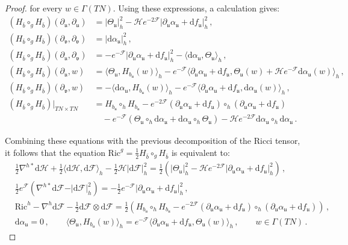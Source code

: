 \documentclass[10pt,a4paper,twoside,reqno]{amsart}
\theoremstyle{plain}
\theoremstyle{definition}
\theoremstyle{remark}
\def\dd{\mathrm{d}}
\def\cH{\mathcal{H}}
\def\cF{\mathcal{F}}
\def\cH{\mathcal{H}}
\def\dd{\mathrm{d}}
\def\fru{\mathfrak{u}}
\def\frv{\mathfrak{v}}
\begin{document}
\begin{proof}
\noindent
for every $w\in\Gamma(TN)$. Using these expressions, a calculation gives:
\begin{equation}\label{eq:HHstandard}
\begin{aligned}
(H_{\bar{b}}\circ_g H_{\bar{b}})(\partial_{\fru} , \partial_{\fru}) &= \vert\Theta_{\fru}\vert^2_h - \cH e^{-2\cF} \vert \partial_{\fru} \alpha_{\fru} + \dd f_{\fru}\vert_h^2\, ,\\
(H_{\bar{b}}\circ_g H_{\bar{b}})(\partial_{\frv} , \partial_{\frv}) &= \vert \dd \alpha_{\fru} \vert^2_h\, ,\\
(H_{\bar{b}}\circ_g H_{\bar{b}})(\partial_{\fru} , \partial_{\frv}) &= - e^{-\cF} \vert \partial_{\fru} \alpha_{\fru} + \dd f_{\fru}\vert^2_h - \langle \dd\alpha_{\fru}, \Theta_{\fru} \rangle_h\, ,\\
(H_{\bar{b}}\circ_g H_{\bar{b}})(\partial_{\fru} , w) &= \langle \Theta_{\fru} , H_{b_{\fru}}(w) \rangle_h - e^{-\cF}\langle \partial_{\fru}\alpha_{\fru} + \dd f_{\fru} , \Theta_{\fru}(w) + \cH e^{-\cF} \dd\alpha_{\fru}(w)\rangle_h\, ,\\
(H_{\bar{b}}\circ_g H_{\bar{b}})(\partial_{\frv} , w) &= - \langle \dd\alpha_{\fru} , H_{b_{\fru}}(w) \rangle_h - e^{-\cF}\langle \partial_{\fru}\alpha_{\fru} + \dd f_{\fru}, \dd\alpha_{\fru}(w)\rangle_h\, ,\\
(H_{\bar{b}}\circ_g H_{\bar{b}})\vert_{TN\times TN} &= H_{b_{\fru}}\circ_h H_{b_{\fru}} - e^{-2\cF} (\partial_{\fru}\alpha_{\fru} + \dd f_{\fru} ) \circ_h (\partial_{\fru}\alpha_{\fru} + \dd f_{\fru})\\
&\quad - e^{-\cF} (\Theta_{\fru}\circ_h \dd \alpha_{\fru} + \dd \alpha_{\fru} \circ_h \Theta_{\fru}) - \cH e^{-2\cF} \dd \alpha_{\fru} \circ_h \dd \alpha_{\fru}\, .
\end{aligned}
\end{equation}

\noindent
Combining these equations with the previous decomposition of the Ricci tensor, it follows that the equation $\mathrm{Ric}^g = \frac{1}{2} H_{\bar{b}} \circ_g H_{\bar{b}}$ is equivalent to:
 \begin{eqnarray*}
& \frac{1}{2} \nabla^{h\ast} \dd\cH + \frac{1}{2} \langle \dd\cH, \dd\cF \rangle_h - \frac{1}{2} \cH \vert \dd\cF \vert^2_h  =  \frac{1}{2} (\vert\Theta_{\fru} \vert^2_h - \cH e^{-2\cF} \vert \partial_{\fru} \alpha_{\fru} + \dd f_{\fru}\vert_h^2)\, ,\\  
& \frac{1}{2} e^{\cF} \left( \nabla^{h\ast}\dd \cF - \vert \dd\cF \vert^2_h \right)  = - \frac{1}{2} e^{-\cF} \vert \partial_{\fru} \alpha_{\fru} + \dd f_{\fru} \vert^2_h\, ,\\
& \mathrm{Ric}^h - \nabla^h \dd \cF - \frac{1}{2} \dd \cF \otimes \dd \cF =\frac{1}{2} (H_{b_{\fru}}\circ_h H_{b_{\fru}} - e^{-2\cF} (\partial_{\fru}\alpha_{\fru} + \dd f_{\fru})\circ_h (\partial_{\fru}\alpha_{\fru} + \dd f_{\fru}))\, ,\\
&  \dd\alpha_{\fru} = 0\, ,\qquad \langle \Theta_{\fru} , H_{b_{\fru}}(w) \rangle_h = e^{-\cF}\langle \partial_{\fru}\alpha_{\fru} + \dd f_{\fru} , \Theta_{\fru}(w)  \rangle_h\, , \qquad w\in\Gamma(TN)\, .
\end{eqnarray*}


\end{proof}
\end{document}
